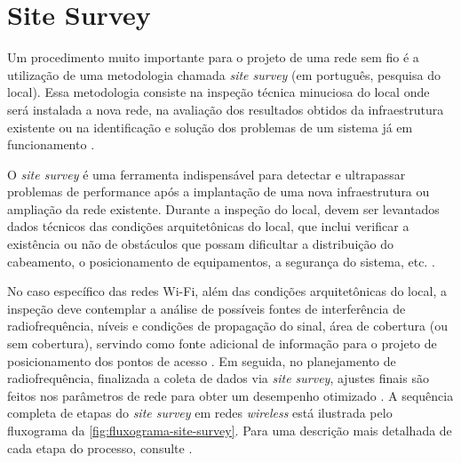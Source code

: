 \section{Site Survey}
\label{sec:site-survey}

Um procedimento muito importante para o projeto de uma rede sem fio é a utilização de uma metodologia chamada \textit{site survey} (em português, pesquisa do local). Essa metodologia consiste na inspeção técnica minuciosa do local onde será instalada a nova rede, na avaliação dos resultados obtidos da infraestrutura existente ou na identificação e solução dos problemas de um sistema já em funcionamento \cite{pinheiro2004site}.

O \textit{site survey} é uma ferramenta indispensável para detectar e ultrapassar problemas de performance após a implantação de uma nova infraestrutura ou ampliação da rede existente. Durante a inspeção do local, devem ser levantados dados técnicos das condições arquitetônicas do local, que inclui verificar a existência ou não de obstáculos que possam dificultar a distribuição do cabeamento, o posicionamento de equipamentos, a segurança do sistema, etc. \cite{moraes2010,pinheiro2004site}.

No caso específico das redes Wi-Fi, além das condições arquitetônicas do local, a inspeção deve contemplar a análise de possíveis fontes de interferência de radiofrequência, níveis e condições de propagação do sinal, área de cobertura (ou sem cobertura), servindo como fonte adicional de informação para o projeto de posicionamento dos pontos de acesso \cite{pinheiro2004site}. Em seguida, no planejamento de radiofrequência, finalizada a coleta de dados via \textit{site survey}, ajustes finais são feitos nos parâmetros de rede para obter um desempenho otimizado \cite{kar2018ieee}. A sequência completa de etapas do \textit{site survey} em redes \textit{wireless} está ilustrada pelo fluxograma da \autoref{fig:fluxograma-site-survey}. Para uma descrição mais detalhada de cada etapa do processo, consulte .


